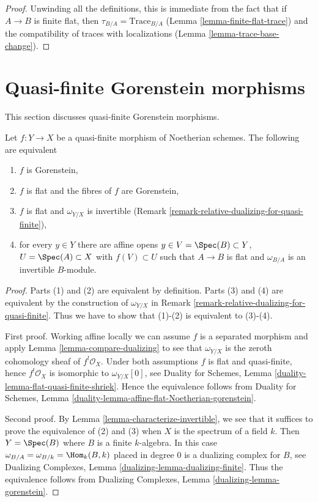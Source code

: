 \begin{proof}
Unwinding all the definitions, this is immediate from the fact
that if $A \to B$ is finite flat, then $\tau_{B/A} = \text{Trace}_{B/A}$
(Lemma \ref{lemma-finite-flat-trace}) and the compatibility
of traces with localizations (Lemma \ref{lemma-trace-base-change}).
\end{proof}








\section{Quasi-finite Gorenstein morphisms}
\label{section-gorenstein-lci}

\noindent
This section discusses quasi-finite Gorenstein morphisms.

\begin{lemma}
\label{lemma-gorenstein-quasi-finite}
Let $f : Y \to X$ be a quasi-finite morphism of Noetherian schemes.
The following are equivalent
\begin{enumerate}
\item $f$ is Gorenstein,
\item $f$ is flat and the fibres of $f$ are Gorenstein,
\item $f$ is flat and $\omega_{Y/X}$ is invertible
(Remark \ref{remark-relative-dualizing-for-quasi-finite}),
\item for every $y \in Y$ there are affine opens
$y \in V = \Spec(B) \subset Y$, $U = \Spec(A) \subset X$
with $f(V) \subset U$ such that $A \to B$ is flat
and $\omega_{B/A}$ is an invertible $B$-module.
\end{enumerate}
\end{lemma}

\begin{proof}
Parts (1) and (2) are equivalent by definition. Parts (3) and (4)
are equivalent by the construction of $\omega_{Y/X}$ in
Remark \ref{remark-relative-dualizing-for-quasi-finite}.
Thus we have to show that (1)-(2) is equivalent to (3)-(4).

\medskip\noindent
First proof. Working affine locally we can assume $f$ is a separated
morphism and apply Lemma \ref{lemma-compare-dualizing} to see that
$\omega_{Y/X}$ is the zeroth cohomology sheaf of $f^!\mathcal{O}_X$.
Under both assumptions $f$ is flat and quasi-finite, hence
$f^!\mathcal{O}_X$ is isomorphic to $\omega_{Y/X}[0]$, see
Duality for Schemes, Lemma \ref{duality-lemma-flat-quasi-finite-shriek}. Hence
the equivalence follows from
Duality for Schemes, Lemma
\ref{duality-lemma-affine-flat-Noetherian-gorenstein}.

\medskip\noindent
Second proof. By Lemma \ref{lemma-characterize-invertible},
we see that it suffices to prove the equivalence of
(2) and (3) when $X$ is the spectrum of a field $k$.
Then $Y = \Spec(B)$ where $B$ is a finite $k$-algebra.
In this case $\omega_{B/A} = \omega_{B/k} = \Hom_k(B, k)$
placed in degree $0$ is a dualizing complex for $B$, see
Dualizing Complexes, Lemma \ref{dualizing-lemma-dualizing-finite}.
Thus the equivalence follows from
Dualizing Complexes, Lemma \ref{dualizing-lemma-gorenstein}.
\end{proof}

